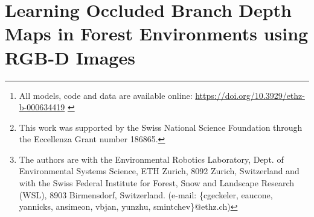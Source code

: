 \chapter[Learning Occluded Branch Depth Maps in Forest Environments]{Learning Occluded Branch Depth Maps in Forest Environments using RGB-D Images}
\label{ch:OBR}

\newcommand{\figurevspaceabove}{0cm}
\newcommand{\figurevspacebelow}{0cm}


\author{
Christian~Geckeler,
Emanuele~Aucone,
Yannick~Schnider,
Andri~Simeon,\\
Jan-Philipp~von~Bassewitz,
Yunying~Zhu,
and Stefano~Mintchev%
\thanks{This work was supported by the Swiss National Science Foundation through the Eccellenza Grant number 186865.}%
\thanks{The authors are with the Environmental Robotics Laboratory, Dept. of Environmental Systems Science, ETH Zurich, 8092 Zurich, Switzerland and with the Swiss Federal Institute for Forest, Snow and Landscape Research (WSL), 8903 Birmensdorf, Switzerland. (e-mail: \{cgeckeler, eaucone, yannicks, ansimeon, vbjan, yunzhu, smintchev\}@ethz.ch)}%
}

\begin{abstract}
Covering over a third of all terrestrial land area, forests are crucial environments; as ecosystems, for farming, and for human leisure. However, they are challenging to access for environmental monitoring, for agricultural uses, and for search and rescue applications. To enter, aerial robots need to fly through dense vegetation, where foliage can be pushed aside, but occluded branches pose critical obstacles. Therefore, we propose pixel-wise depth regression of occluded branches using three different U-Net inspired architectures. Given \mbox{RGB-D} input of trees with partially occluded branches, the models estimate depth values of only the wooden parts of the tree. A large photorealistic simulation dataset comprising around 44K images of nine different tree species is generated, on which the models are trained. Extensive evaluation and analysis of the models on this dataset is shown. To improve network generalization to real-world data, different data augmentation and transformation techniques are performed. The approaches are then also successfully demonstrated on real-world data of broadleaf trees from Swiss temperate forests and a tropical Masoala Rainforest. This work showcases the previously unexplored task of frame-by-frame pixel-based occluded branch depth reconstruction to facilitate robot traversal of forest environments.
All models, code, and data are available online. \cite{Geckeler2023OBRSupplementary}\footnote{All models, code and data are available online: \href{https://doi.org/10.3929/ethz-b-000634419}{https://doi.org/10.3929/ethz-b-000634419} \cite{Geckeler2023OBRSupplementary}}
\end{abstract}

